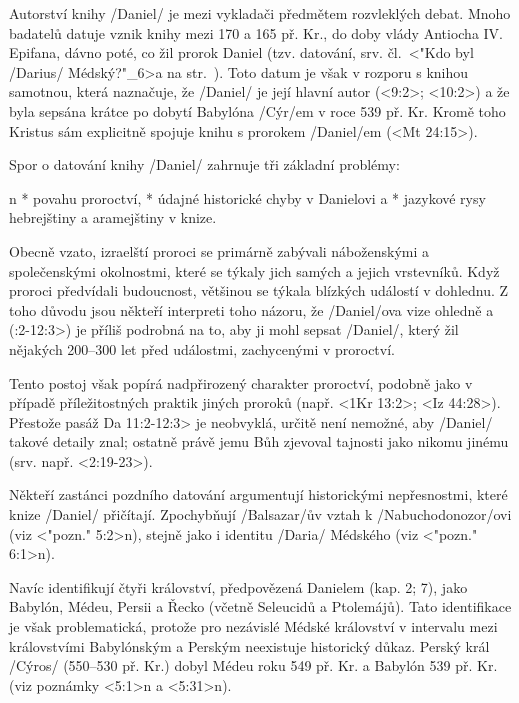 \enditems




Autorství knihy \x/Daniel/ je mezi vykladači předmětem rozvleklých debat.
Mnoho badatelů datuje vznik knihy mezi 170 a 165 př. Kr., do doby vlády Antiocha IV. Epifana, dávno poté, co žil prorok Daniel (tzv.  datování, srv. čl.~<"Kdo byl \x/Darius/ Médský?"_6>a na str.~\pg). 
Toto datum je však v rozporu s knihou samotnou, která naznačuje, že \x/Daniel/ je její hlavní autor (<9:2>; <10:2>) a že byla sepsána krátce po dobytí Babylóna \x/Cýr/em v roce 539 př. Kr. Kromě toho  Kristus sám explicitně spojuje knihu s prorokem \x/Daniel/em (<Mt 24:15>).


Spor o datování knihy \x/Daniel/ zahrnuje tři základní problémy:

\begitems \style n
* povahu proroctví,
* údajné historické chyby v Danielovi a 
* jazykové rysy hebrejštiny a aramejštiny v knize.
\enditems

Obecně vzato, izraelští proroci se primárně zabývali náboženskými a společenskými okolnostmi, které se týkaly jich samých a jejich vrstevníků. Když proroci předvídali budoucnost, většinou se týkala blízkých událostí v dohlednu.
Z toho důvodu jsou někteří interpreti toho názoru, že \x/Daniel/ova vize ohledně  a  (:2-12:3>) je příliš podrobná na to, aby ji mohl sepsat \x/Daniel/, který žil nějakých 200--300 let před událostmi, zachycenými v proroctví.

Tento postoj však popírá nadpřirozený charakter proroctví, podobně jako v případě příležitostných praktik jiných proroků (např. <1Kr 13:2>; <Iz 44:28>). Přestože pasáž  \<Da 11:2-12:3> je neobvyklá, určitě není nemožné, aby \x/Daniel/ takové detaily znal; ostatně právě jemu Bůh zjevoval tajnosti jako nikomu jinému (srv. např. <2:19-23>).  


Někteří zastánci pozdního datování argumentují historickými nepřesnostmi, které knize \x/Daniel/ přičítají.
Zpochybňují \x/Balsazar/ův vztah k \x/Nabuchodonozor/ovi (viz <"pozn." 5:2>n), stejně jako i identitu  \x/Daria/ Médského (viz <"pozn." 6:1>n). 

Navíc identifikují čtyři království, předpovězená Danielem (kap. 2; 7), jako Babylón, Médeu, Persii a Řecko (včetně Seleucidů a Ptolemájů). Tato identifikace je však problematická, protože pro nezávislé Médské království v intervalu mezi královstvími Babylónským a Perským neexistuje historický důkaz.
Perský král \x/Cýros/ (550--530 př. Kr.) dobyl Médeu roku 549 př. Kr. a Babylón 539 př. Kr. (viz poznámky <5:1>n a <5:31>n).

